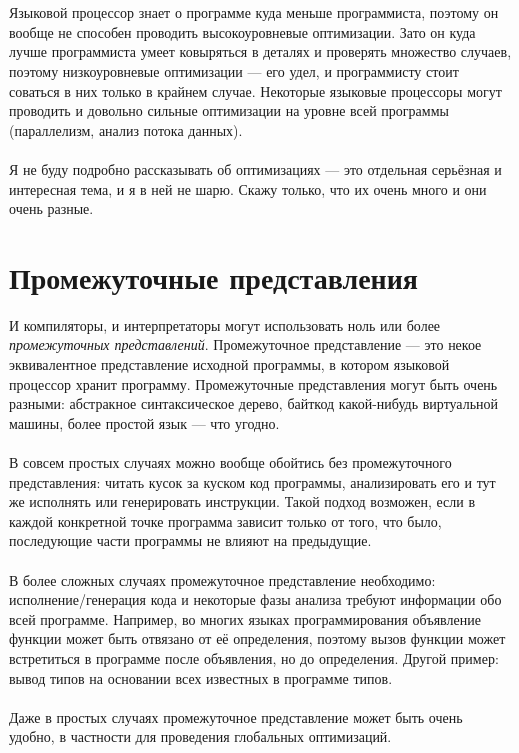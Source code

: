 \documentclass[11pt]{book}
\begin{document}
\\ \\
Языковой процессор знает о программе куда меньше программиста, поэтому он вообще не способен проводить высокоуровневые оптимизации.
Зато он куда лучше программиста умеет ковыряться в деталях и проверять множество случаев,
поэтому низкоуровневые оптимизации --- его удел, и программисту стоит соваться в них только в крайнем случае.
Некоторые языковые процессоры могут проводить и довольно сильные оптимизации
на уровне всей программы (параллелизм, анализ потока данных).
\\ \\
Я не буду подробно рассказывать об оптимизациях --- это отдельная серьёзная и интересная тема, и я в ней не шарю.
Скажу только, что их очень много и они очень разные.

\section{Промежуточные представления}
И компиляторы, и интерпретаторы могут использовать ноль или более \emph{промежуточных представлений}.
Промежуточное представление --- это некое эквивалентное представление исходной программы,
в котором языковой процессор хранит программу.
Промежуточные представления могут быть очень разными: абстракное синтаксическое дерево,
байткод какой-нибудь виртуальной машины, более простой язык --- что угодно.
\\ \\
В совсем простых случаях можно вообще обойтись без промежуточного представления:
читать кусок за куском код программы, анализировать его и тут же исполнять или генерировать инструкции.
Такой подход возможен, если в каждой конкретной точке программа зависит только от того, что было,
последующие части программы не влияют на предыдущие.
\\ \\
В более сложных случаях промежуточное представление необходимо:
исполнение/генерация кода и некоторые фазы анализа требуют информации обо всей программе.
Например, во многих языках программирования объявление функции может быть отвязано от её определения,
поэтому вызов функции может встретиться в программе после объявления, но до определения.
Другой пример: вывод типов на основании всех известных в программе типов.
\\ \\
Даже в простых случаях промежуточное представление может быть очень удобно,
в частности для проведения глобальных оптимизаций.
\end{document}
